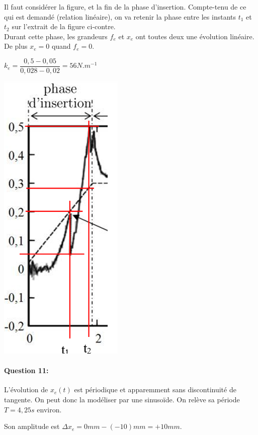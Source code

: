 \begin{minipage}{0.65\linewidth}
Il faut considérer la figure, et la fin de la phase d'insertion. Compte-tenu de ce qui est demandé (relation linéaire), on va retenir la phase entre les instants $t_1$ et $t_2$ sur l'extrait de la figure ci-contre. \\
Durant cette phase, les grandeurs $f_e$ et $x_e$ ont toutes deux une évolution linéaire. De plus $x_e=0$ quand $f_e=0$.

$k_e=\dfrac{0,5-0,05}{0,028-0,02}=56N.m^{-1}$
\end{minipage}\hfill
\begin{minipage}{0.3\linewidth}
\begin{center}
 \includegraphics[width=0.4\linewidth]{img/extrait}
\end{center}
\end{minipage}


\paragraph{Question 11:}

L'évolution de $x_e(t)$ est périodique et apparemment sans discontinuité de tangente. On peut donc la modéliser par une sinusoïde. On relève sa période $T=4,25s$ environ.

Son amplitude est  $\Delta x_e=0mm-(-10)mm=+10mm$.

